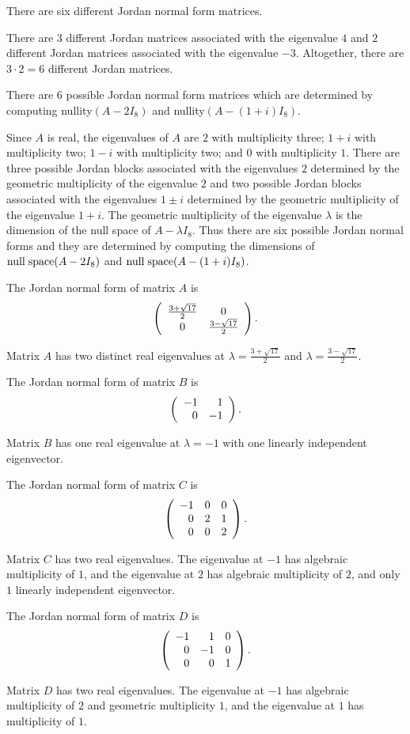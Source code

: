  \ans There are six different Jordan normal form matrices.

\soln  There are $3$ different Jordan matrices associated with the eigenvalue $4$ and
$2$ different Jordan matrices associated with the eigenvalue $-3$.  Altogether, there
are $3\cdot 2=6$ different Jordan matrices.

\newpage
{} \ans There are $6$ possible Jordan normal form matrices which are
determined by computing nullity$(A-2I_8)$ and nullity$(A-(1+i)I_8)$.

\soln  Since $A$ is real, the eigenvalues of $A$ are $2$ with multiplicity three; 
$1+i$ with multiplicity two; $1-i$ with multiplicity two; and $0$ with multiplicity 
$1$.  There are three possible Jordan blocks associated with the eigenvalues $2$
determined by the geometric multiplicity of the eigenvalue $2$ and two possible Jordan
blocks associated with the eigenvalues $1\pm i$ determined by the geometric
multiplicity of the eigenvalue $1+i$.  The geometric multiplicity of the
eigenvalue $\lambda$ is the dimension of the null space of $A-\lambda I_8$.  Thus 
there are six possible Jordan normal forms and they are determined by computing the
dimensions of ${\rm null\;space}(A-2I_8)$ and ${\rm null\;space}(A-(1+i)I_8)$.


\ans The Jordan normal form of matrix $A$ is
\[
\left(\begin{array}{cc} \frac{3 + \sqrt{17}}{2} & 0\\ 0 &\frac{3 - \sqrt{17}}{2}\end{array}\right).
\]

\soln Matrix $A$ has two distinct real eigenvalues at
$\lambda = \frac{3 + \sqrt{17}}{2}$ and 
$\lambda = \frac{3 - \sqrt{17}}{2}$.

\ans The Jordan normal form of matrix $B$ is
\[
\left(\begin{array}{rr} -1 & 1\\ 0 &-1\end{array}\right).
\]

\soln Matrix $B$ has one real eigenvalue at $\lambda = -1$ with one
linearly independent eigenvector.

\ans The Jordan normal form of matrix $C$ is
\[
\left(\begin{array}{rrr} -1 & 0 & 0 \\ 0 & 2 & 1 \\ 0 & 0 & 2\end{array}\right).
\]

\soln Matrix $C$ has two real eigenvalues.  The eigenvalue at $-1$ has
algebraic multiplicity of $1$, and the eigenvalue at $2$ has algebraic
multiplicity of $2$, and only $1$ linearly independent eigenvector.


 \ans The Jordan normal form of matrix $D$ is
\[
\left(\begin{array}{rrr} -1 & 1 & 0 \\ 0 & -1 & 0 \\ 0 & 0 & 1\end{array}\right).
\]

\soln Matrix $D$ has two real eigenvalues.  The eigenvalue at $-1$ has
algebraic multiplicity of $2$ and geometric multiplicity $1$, and the eigenvalue at 
$1$ has multiplicity of $1$.

